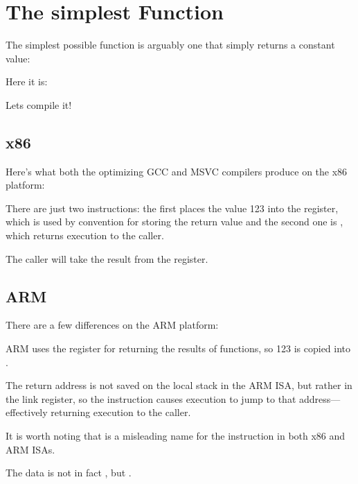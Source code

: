 \section{The simplest Function}

The simplest possible function is arguably one that simply returns a constant value:

Here it is:



Lets compile it!

\subsection{x86}

Here's what both the optimizing GCC and MSVC compilers produce on the x86 platform:



There are just two instructions: the first places the value 123 into the \EAX register, 
which is used by convention for storing the return
value and the second one is \RET, which returns execution to the \gls{caller}.

The caller will take the result from the \EAX register.

\subsection{ARM}

There are a few differences on the ARM platform:



ARM uses the register  for returning the results of functions, so 123 is copied into .

The return address is not saved on the local stack in the ARM \ac{ISA}, but rather in the link register, 
so the  instruction causes execution to jump to that address---effectively returning execution to the \gls{caller}.

It is worth noting that \MOV is a misleading name for the instruction in both x86 and ARM \ac{ISA}s.

The data is not in fact , but .

